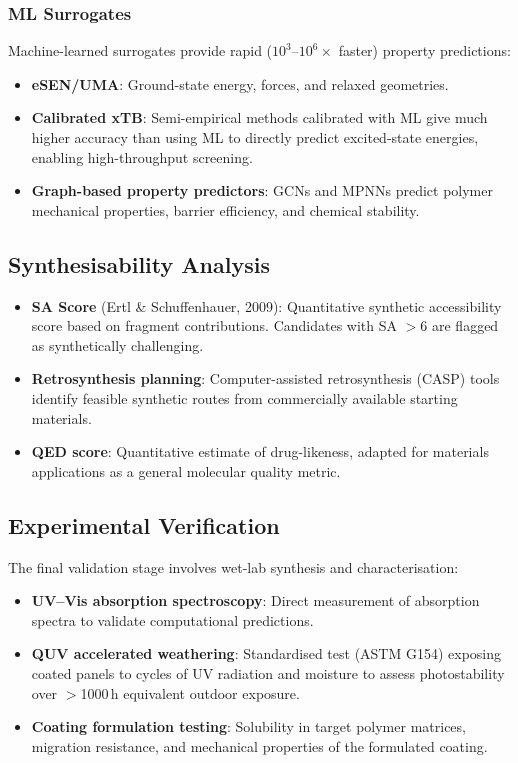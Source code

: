 \documentclass[11pt,a4paper]{article}
\begin{document}
\subsubsection{ML Surrogates}

Machine-learned surrogates provide rapid ($10^3$--$10^6\times$ faster)
property predictions:

\begin{itemize}[leftmargin=2em]
  \item \textbf{eSEN/UMA}: Ground-state energy, forces, and relaxed geometries.
  \item \textbf{Calibrated xTB}: Semi-empirical methods calibrated with ML
    give much higher accuracy than using ML to directly predict excited-state
    energies, enabling high-throughput screening.
  \item \textbf{Graph-based property predictors}: GCNs and MPNNs predict
    polymer mechanical properties, barrier efficiency, and chemical
    stability.
\end{itemize}

\subsection{Synthesisability Analysis}

\begin{itemize}[leftmargin=2em]
  \item \textbf{SA Score} (Ertl \& Schuffenhauer, 2009): Quantitative
    synthetic accessibility score based on fragment contributions. Candidates
    with SA $> 6$ are flagged as synthetically challenging.
  \item \textbf{Retrosynthesis planning}: Computer-assisted retrosynthesis
    (CASP) tools identify feasible synthetic routes from commercially
    available starting materials.
  \item \textbf{QED score}: Quantitative estimate of drug-likeness, adapted
    for materials applications as a general molecular quality metric.
\end{itemize}

\subsection{Experimental Verification}

The final validation stage involves wet-lab synthesis and characterisation:

\begin{itemize}[leftmargin=2em]
  \item \textbf{UV--Vis absorption spectroscopy}: Direct measurement of
    absorption spectra to validate computational predictions.
  \item \textbf{QUV accelerated weathering}: Standardised test (ASTM G154)
    exposing coated panels to cycles of UV radiation and moisture to assess
    photostability over $>$1000\,h equivalent outdoor exposure.
  \item \textbf{Coating formulation testing}: Solubility in target polymer
    matrices, migration resistance, and mechanical properties of the
    formulated coating.
\end{itemize}
\end{document}
